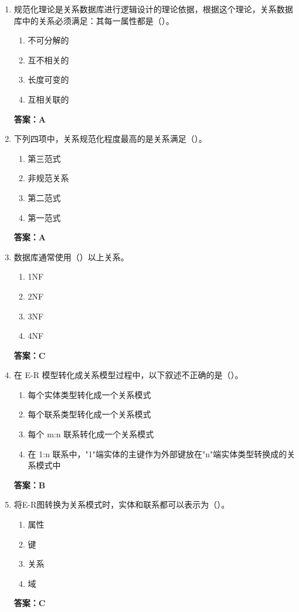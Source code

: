 \documentclass[12pt, a4paper]{article}
\begin{document}
\begin{enumerate}[label=\arabic*.]
	\item 规范化理论是关系数据库进行逻辑设计的理论依据，根据这个理论，关系数据库中的关系必须满足：其每一属性都是（\quad）。
	      \begin{enumerate}
		      \item 不可分解的
		      \item 互不相关的
		      \item 长度可变的
		      \item 互相关联的
	      \end{enumerate}
	      \textbf{答案：A}

	\item 下列四项中，关系规范化程度最高的是关系满足（\quad）。
	      \begin{enumerate}
		      \item 第三范式
		      \item 非规范关系
		      \item 第二范式
		      \item 第一范式
	      \end{enumerate}
	      \textbf{答案：A}

	\item 数据库通常使用（\quad）以上关系。
	      \begin{enumerate}
		      \item 1NF
		      \item 2NF
		      \item 3NF
		      \item 4NF
	      \end{enumerate}
	      \textbf{答案：C}

	\item 在 E-R 模型转化成关系模型过程中，以下叙述不正确的是（\quad）。
	      \begin{enumerate}
		      \item 每个实体类型转化成一个关系模式
		      \item 每个联系类型转化成一个关系模式
		      \item 每个 m:n 联系转化成一个关系模式
		      \item 在 1:n 联系中，"1"端实体的主键作为外部键放在"n"端实体类型转换成的关系模式中
	      \end{enumerate}
	      \textbf{答案：B}

	\item 将E-R图转换为关系模式时，实体和联系都可以表示为（\quad）。
	      \begin{enumerate}
		      \item 属性
		      \item 键
		      \item 关系
		      \item 域
	      \end{enumerate}
	      \textbf{答案：C}


\end{enumerate}
\end{document}
